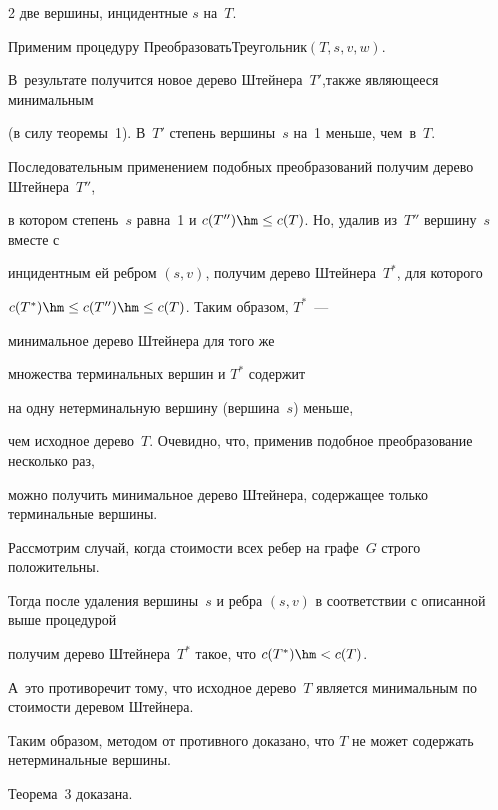 \begin{multicols}{2}
две вершины, инцидентные $s$ на~$T$.


Применим процедуру {\sf Пре\-об\-ра\-зо\-вать\-Тре\-у\-голь\-ник}$(T,s,v,w)$. %


В~ре\-зультате получится новое дерево Штейнера~$T'$,\linebreak также являющееся минимальным


(в силу теоремы~1). В~$T'$ степень вершины~$s$ на~1 меньше, чем~в~$T$.





Последовательным применением подобных преобразований получим дерево Штейнера~$T''$,


в котором степень~$s$ равна~1 и $c(T'') \hm\leq c(T)$. Но, удалив из~$T''$ вершину~$s$ вместе с


инцидентным ей ребром $(s,v)$, получим дерево Штейнера~$T^*$, для которого


$c(T^*) \hm\leq c(T'') \hm\leq c(T)$. Таким образом, $T^*$~---


минимальное дерево Штейнера для того же


множества терминальных вершин и $T^*$ содержит


на одну нетерминальную вершину (вершина~$s$) меньше,


чем  исходное дерево~$T$. Очевидно, что, применив подобное преобразование несколько раз,


можно получить минимальное дерево Штейнера, содержащее только терминальные вершины.





Рассмотрим случай, когда стоимости всех ребер на графе~$G$ строго положительны.


Тогда после удаления вершины~$s$ и ребра $(s,v)$ в соответствии с описанной выше процедурой


получим дерево Штейнера~$T^*$ такое, что $c(T^*) \hm< c(T)$.


А~это противоречит тому, что исходное дерево~$T$ является минимальным по стоимости деревом Штейнера.


Таким образом, методом от противного доказано, что $T$ не может содержать нетерминальные вершины.


Теорема~3 доказана.








\smallskip






\end{multicols}
